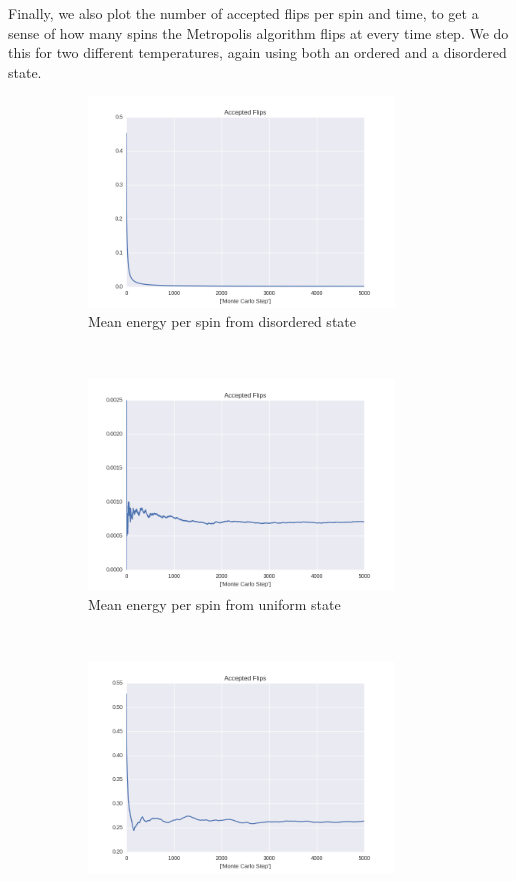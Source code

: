 \documentclass[a4paper, 10pt]{article}
\begin{document}
Finally, we also plot the number of accepted flips per spin and time, to get a sense of how many spins the Metropolis algorithm flips at every time step. We do this for two different temperatures, again using both an ordered and a disordered state.
\begin{figure}[!ht]
    \centering
    \begin{subfigure}[H!]{0.5\textwidth}
        \centering
        \includegraphics[height=2.2in]{flipsWRandomStart.png}
        \caption{Mean energy per spin from disordered state}
    \end{subfigure}%
    ~ 
    \begin{subfigure}[H!]{0.5\textwidth}
        \centering
        \includegraphics[height=2.2in]{flipsWUpStart.png}
        \caption{Mean energy per spin from uniform state}
    \end{subfigure}
        ~
     \begin{subfigure}[H!]{0.5\textwidth}
        \centering
        \includegraphics[height=2.2in]{flipsWRandomStartT24.png}

\end{subfigure}
\end{figure}
\end{document}
